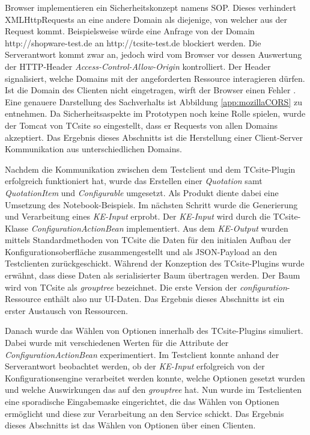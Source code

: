 \documentclass[12pt,a4paper,bibliography=totocnumbered,listof=totoc]{scrartcl}
\begin{document}
Browser implementieren ein Sicherheitskonzept namens \ac{SOP}. Dieses verhindert XMLHttpRequests an eine andere Domain als diejenige, von welcher aus der Request kommt. Beispielsweise würde eine Anfrage von der Domain \glqq http://shopware-test.de\grqq{} an \glqq http://tcsite-test.de\grqq{} blockiert werden. Die Serverantwort kommt zwar an, jedoch wird vom Browser vor dessen Auswertung der HTTP-Header \emph{Access-Control-Allow-Origin} kontrolliert. Der Header signalisiert, welche Domains mit der angeforderten Ressource interagieren dürfen. Ist die Domain des Clienten nicht eingetragen, wirft der Browser einen Fehler \citep{mozillaCORS}. Eine genauere Darstellung des Sachverhalts ist Abbildung \ref{app:mozillaCORS} zu entnehmen. Da Sicherheitsaspekte im Prototypen noch keine Rolle spielen, wurde der Tomcat von TCsite so eingestellt, dass er Requests von allen Domains akzeptiert. Das Ergebnis dieses Abschnitts ist die Herstellung einer Client-Server Kommunikation aus unterschiedlichen Domains.

Nachdem die Kommunikation zwischen dem Testclient und dem TCsite-Plugin erfolgreich funktioniert hat, wurde das Erstellen einer \emph{Quotation} samt \emph{QuotationItem} und \emph{Configurable} umgesetzt. Als Produkt diente dabei eine Umsetzung des Notebook-Beispiels. Im nächsten Schritt wurde die Generierung und Verarbeitung eines \emph{KE-Input} erprobt. Der \emph{KE-Input} wird durch die TCsite-Klasse \emph{ConfigurationActionBean} implementiert. Aus dem \emph{KE-Output} wurden mittels Standardmethoden von TCsite die Daten für den initialen Aufbau der Konfigurationsoberfläche zusammengestellt und als JSON-Payload an den Testclienten zurückgeschickt. Während der Konzeption des TCsite-Plugins wurde erwähnt, dass diese Daten als serialisierter Baum übertragen werden. Der Baum wird von TCsite als \emph{grouptree} bezeichnet. Die erste Version der \emph{configuration}-Ressource enthält also nur UI-Daten. Das Ergebnis dieses Abschnitts ist ein erster Austausch von Ressourcen.

Danach wurde das Wählen von Optionen innerhalb des TCsite-Plugins simuliert. Dabei wurde mit verschiedenen Werten für die Attribute der \emph{ConfigurationActionBean} experimentiert. Im Testclient konnte anhand der Serverantwort beobachtet werden, ob der \emph{KE-Input} erfolgreich von der Konfigurationsengine verarbeitet werden konnte, welche Optionen gesetzt wurden und welche Auswirkungen das auf den \emph{grouptree} hat. Nun wurde im Testclienten eine sporadische Eingabemaske eingerichtet, die das Wählen von Optionen ermöglicht und diese zur Verarbeitung an den Service schickt. Das Ergebnis dieses Abschnitts ist das Wählen von Optionen über einen Clienten.
\end{document}
